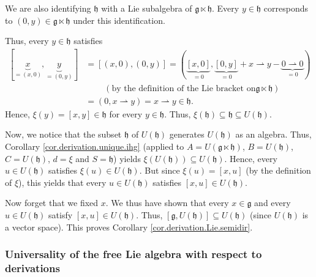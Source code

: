 \documentclass[etingof-lie.tex]{subfiles}
\begin{document}
We are also identifying $\mathfrak{h}$ with a Lie subalgebra of $\mathfrak{g}%
\ltimes\mathfrak{h}$. Every $y\in\mathfrak{h}$ corresponds to $\left(
0,y\right)  \in\mathfrak{g}\ltimes\mathfrak{h}$ under this identification.

Thus, every $y\in\mathfrak{h}$ satisfies%
\begin{align*}
\left[  \underbrace{x}_{=\left(  x,0\right)  },\underbrace{y}_{=\left(
0,y\right)  }\right]   &  =\left[  \left(  x,0\right)  ,\left(  0,y\right)
\right]  =\left(  \underbrace{\left[  x,0\right]  }_{=0},\underbrace{\left[
0,y\right]  }_{=0}+x\rightharpoonup y-\underbrace{0\rightharpoonup0}%
_{=0}\right) \\
&  \ \ \ \ \ \ \ \ \ \ \left(  \text{by the definition of the Lie bracket on
}\mathfrak{g}\ltimes\mathfrak{h}\right) \\
&  =\left(  0,x\rightharpoonup y\right)  =x\rightharpoonup y\in\mathfrak{h}.
\end{align*}
Hence, $\xi\left(  y\right)  =\left[  x,y\right]  \in\mathfrak{h}$ for every
$y\in\mathfrak{h}$. Thus, $\xi\left(  \mathfrak{h}\right)  \subseteq
\mathfrak{h}\subseteq U\left(  \mathfrak{h}\right)  $.

Now, we notice that the subset $\mathfrak{h}$ of $U\left(  \mathfrak{h}%
\right)  $ generates $U\left(  \mathfrak{h}\right)  $ as an algebra. Thus,
Corollary \ref{cor.derivation.unique.ihg} (applied to $A=U\left(
\mathfrak{g}\ltimes\mathfrak{h}\right)  $, $B=U\left(  \mathfrak{h}\right)  $,
$C=U\left(  \mathfrak{h}\right)  $, $d=\xi$ and $S=\mathfrak{h}$) yields
$\xi\left(  U\left(  \mathfrak{h}\right)  \right)  \subseteq U\left(
\mathfrak{h}\right)  $. Hence, every $u\in U\left(  \mathfrak{h}\right)  $
satisfies $\xi\left(  u\right)  \in U\left(  \mathfrak{h}\right)  $. But since
$\xi\left(  u\right)  =\left[  x,u\right]  $ (by the definition of $\xi$),
this yields that every $u\in U\left(  \mathfrak{h}\right)  $ satisfies
$\left[  x,u\right]  \in U\left(  \mathfrak{h}\right)  $.

Now forget that we fixed $x$. We thus have shown that every $x\in\mathfrak{g}$
and every $u\in U\left(  \mathfrak{h}\right)  $ satisfy $\left[  x,u\right]
\in U\left(  \mathfrak{h}\right)  $. Thus, $\left[  \mathfrak{g},U\left(
\mathfrak{h}\right)  \right]  \subseteq U\left(  \mathfrak{h}\right)  $ (since
$U\left(  \mathfrak{h}\right)  $ is a vector space). This proves Corollary
\ref{cor.derivation.Lie.semidir}.

\subsubsection{Universality of the free Lie algebra with respect to
derivations}
\end{document}
